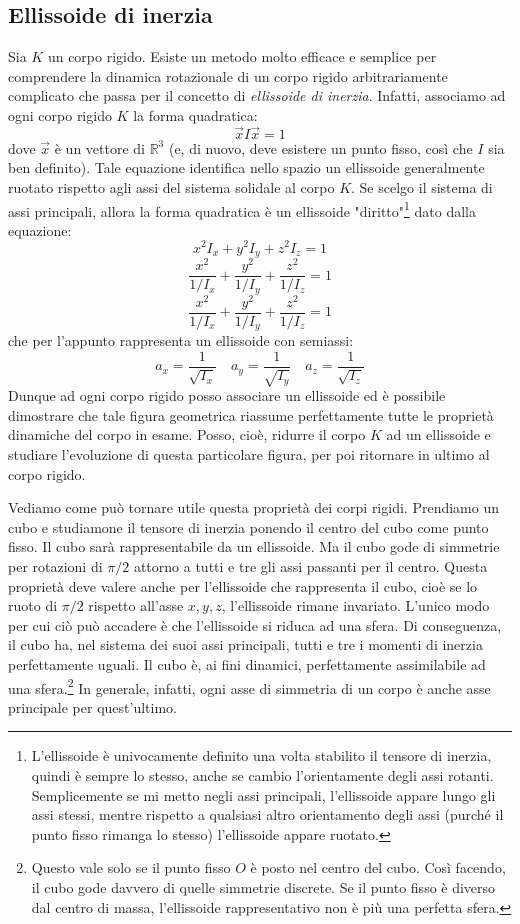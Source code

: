 \documentclass[a4paper,openany]{article}
\begin{document}
	\subsection{Ellissoide di inerzia}
	Sia $K$ un corpo rigido. Esiste un metodo molto efficace e semplice per comprendere la dinamica rotazionale di un corpo rigido arbitrariamente complicato che passa per il concetto di \textit{ellissoide di inerzia}. Infatti, associamo ad ogni corpo rigido $K$ la forma quadratica:
	$$
	\vec{x}I\vec{x} = 1
	$$
	dove $\vec{x}$ è un vettore di $\mathbb{R}^{3}$ (e, di nuovo, deve esistere un punto fisso, così che $I$ sia ben definito). Tale equazione identifica nello spazio un ellissoide generalmente ruotato rispetto agli assi del sistema solidale al corpo $K$. Se scelgo il sistema di assi principali, allora la forma quadratica è un ellissoide "diritto"\footnote{L'ellissoide è univocamente definito una volta stabilito il tensore di inerzia, quindi è sempre lo stesso, anche se cambio l'orientamente degli assi rotanti. Semplicemente se mi metto negli assi principali, l'ellissoide appare lungo gli assi stessi, mentre rispetto a qualsiasi altro orientamento degli assi (purché il punto fisso rimanga lo stesso) l'ellissoide appare ruotato.} dato dalla equazione:
	$$
	x^{2}I_{x} + y^{2}I_{y}+ z^{2}I_{z} = 1
	$$
	$$
	\dfrac{x^{2}}{1/I_x} + \dfrac{y^{2}}{1/I_y} + \dfrac{z^{2}}{1/I_z} = 1
	$$
	$$
	\dfrac{x^{2}}{1/I_x} + \dfrac{y^{2}}{1/I_y} + \dfrac{z^{2}}{1/I_z} = 1
	$$
	che per l'appunto rappresenta un ellissoide con semiassi:
	$$
	a_{x} = \dfrac{1}{\sqrt{I_x}} \quad a_{y} = \dfrac{1}{\sqrt{I_y}} \quad a_{z} = \dfrac{1}{\sqrt{I_z}}
	$$
	Dunque ad ogni corpo rigido posso associare un ellissoide ed è possibile dimostrare che tale figura geometrica riassume perfettamente tutte le proprietà dinamiche del corpo in esame. Posso, cioè, ridurre il corpo $K$ ad un ellissoide e studiare l'evoluzione di questa particolare figura, per poi ritornare in ultimo al corpo rigido. 
	
	
	
	Vediamo come può tornare utile questa proprietà dei corpi rigidi. Prendiamo un cubo e studiamone il tensore di inerzia ponendo il centro del cubo come punto fisso. Il cubo sarà rappresentabile da un ellissoide. Ma il cubo gode di simmetrie per rotazioni di $\pi/2$ attorno a tutti e tre gli assi passanti per il centro. Questa proprietà deve valere anche per l'ellissoide che rappresenta il cubo, cioè se lo ruoto di $\pi/2$ rispetto all'asse $x,y,z$, l'ellissoide rimane invariato. L'unico modo per cui ciò può accadere è che l'ellissoide si riduca ad una sfera. Di conseguenza, il cubo ha, nel sistema dei suoi assi principali, tutti e tre i momenti di inerzia perfettamente uguali. Il cubo è, ai fini dinamici, perfettamente assimilabile ad una sfera.\footnote{Questo vale solo se il punto fisso $O$ è posto nel centro del cubo. Così facendo, il cubo gode davvero di quelle simmetrie discrete. Se il punto fisso è diverso dal centro di massa, l'ellissoide rappresentativo non è più una perfetta sfera.} In generale, infatti, ogni asse di simmetria di un corpo è anche asse principale per quest'ultimo.
\end{document}
